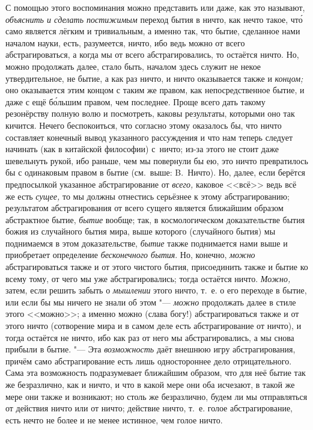 С помощью этого воспоминания можно представить или даже, как это называют,
{\em объяснить и сделать постижимым} переход бытия в ничто, как нечто такое,
чт\'{о} само является лёгким и тривиальным, а именно так, что бытие, сделанное
нами началом науки, есть, разумеется, ничто, ибо ведь можно от всего
абстрагироваться, а когда мы от всего абстрагировались, то остаётся ничто. Но,
можно продолжать далее, стало быть, началом здесь служит не некое
утвердительное, не бытие, а как раз ничто, и ничто оказывается также и
{\em концом;} оно оказывается этим концом с таким же правом, как
непосредственное бытие, и даже с ещё б\'{о}льшим правом, чем последнее. Проще
всего дать такому резонёрству полную волю и посмотреть,
каковы результаты, которыми оно так кичится. Нечего
беспокоиться, что согласно этому оказалось бы, что ничто составляет конечный
вывод указанного рассуждения и что нам теперь следует начинать (как в китайской
философии) с~ничто; из-за этого не стоит даже шевельнуть рукой, ибо раньше, чем
мы повернули бы ею, это ничто превратилось бы с одинаковым правом в бытие
(см.~выше: B.~Ничто). Но, далее, если берётся предпосылкой указанное
абстрагирование от {\em всего,} каковое <<всё>> ведь всё же есть {\em сущее,}
то мы должны отнестись серьёзнее к этому абстрагированию; результатом
абстрагирования от всего сущего является ближайшим образом абстрактное бытие,
{\em бытие} вообще; так, в космологическом доказательстве бытия божия из
случайного бытия мира, выше которого (случайного бытия) мы поднимаемся в этом
доказательстве, {\em бытие} также поднимается нами выше и приобретает
определение {\em бесконечного бытия}. Но, конечно, {\em можно} абстрагироваться
также и от этого чистого бытия, присоединить также и бытие ко всему тому, от
чего мы уже абстрагировались; тогда остаётся ничто. {\em Можно,} затем, если
решить забыть о {\em мышлении} этого ничто, т.~е. о его переходе в бытие, или
если бы мы ничего не знали об этом "--- {\em можно} продолжать далее в стиле
этого <<можно>>; а именно можно (слава богу!) абстрагироваться также и от этого
ничто (сотворение мира и в самом деле есть абстрагирование от ничто), и тогда
остаётся не ничто, ибо как раз от него мы абстрагировались, а мы снова прибыли
в бытие. "--- Эта {\em возможность} даёт внешнюю игру абстрагирования,
причём само абстрагирование есть лишь одностороннее дело отрицательного. Сама
эта возможность подразумевает ближайшим образом, что для неё бытие так же
безразлично, как и ничто, и что в какой мере они оба исчезают, в такой же мере
они также и возникают; но столь же безразлично, будем ли мы отправляться от
действия ничто или от ничто; действие ничто, т.~е. голое абстрагирование, есть
нечто не более и не менее истинное, чем голое ничто.

